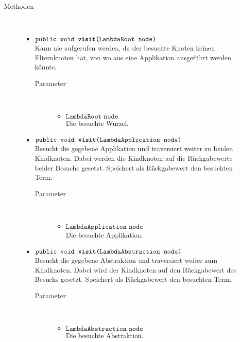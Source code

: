 \begin{description}
\item[Methoden] \hfill \\
	\vspace{-.8cm}
	\begin{itemize}
		\item $\texttt{public void \textbf{visit}(LambdaRoot node)}$ \\ Kann nie aufgerufen werden, da der besuchte Knoten keinen Elternknoten hat, von wo aus eine Applikation ausgeführt werden könnte.
		\begin{description}
			\item[Parameter] \hfill \\
			\vspace{-.8cm}
			\begin{itemize}
				\item $\texttt{LambdaRoot node}$ \\ Die besuchte Wurzel.
			\end{itemize}
		\end{description}
				
		\item $\texttt{public void \textbf{visit}(LambdaApplication node)}$ \\ Besucht die gegebene Applikation und traversiert weiter zu beiden Kindknoten. Dabei werden die Kindknoten auf die Rückgabewerte beider Besuche gesetzt. Speichert als Rückgabewert den besuchten Term.
		\begin{description}
			\item[Parameter] \hfill \\
			\vspace{-.8cm}
			\begin{itemize}
				\item $\texttt{LambdaApplication node}$ \\ Die besuchte Applikation.
			\end{itemize}
		\end{description}
		
		\item $\texttt{public void \textbf{visit}(LambdaAbstraction node)}$ \\ Besucht die gegebene Abstraktion und traversiert weiter zum Kindknoten. Dabei wird der Kindknoten auf den Rückgabewert des Besuchs gesetzt. Speichert als Rückgabewert den besuchten Term.
		\begin{description}
			\item[Parameter] \hfill \\
			\vspace{-.8cm}
			\begin{itemize}
				\item $\texttt{LambdaAbstraction node}$ \\ Die besuchte Abstraktion.
			\end{itemize}
		\end{description}
		

\end{itemize}
\end{description}
